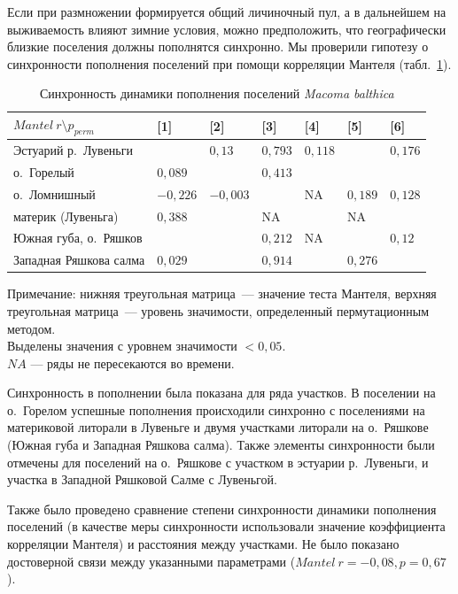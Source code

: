 Если при размножении формируется общий личиночный пул, а в дальнейшем на выживаемость влияют зимние условия, можно предположить, что географически близкие поселения должны пополнятся синхронно.
Мы проверили гипотезу о синхронности пополнения поселений при помощи корреляции Мантеля (табл.~\ref{tab:Mantel_dynamic_N1y}).
	\begin{table}[p]
	\caption{Синхронность динамики пополнения поселений {\it Macoma balthica}}
	\label{tab:Mantel_dynamic_N1y}
        \begin{tabularx}{\textwidth}{|p{}|*{6}{X|}} 
	\hline
	$Mantel \ r \setminus p_{perm}$ & [1] & [2] & [3] & [4] & [5] & [6] \\ \hline
	[1] Эстуарий р.~Лувеньги             &         & $0,13$    & $0,793$      & $0,118$   & \cellcolor{yellow}{$0,001$} & $0,176$ \\ \hline
	[2] о.~Горелый             & $0,089$   &         & $0,413$      & \cellcolor{yellow}{$0,009$}   & \cellcolor{yellow}{$0,004$} & \cellcolor{yellow}{$0,001$} \\ \hline
	[3] о.~Ломнишный          & $-0,226$  & $-0,003$  &            & NA      & $0,189$ & $0,128$ \\ \hline
	[4] материк (Лувеньга)             & $0,388$   & \cellcolor{yellow}{$0,955$}   & NA         &         & NA    & \cellcolor{yellow}{$0,02$}  \\ \hline
	[5] Южная губа, о.~Ряшков                 & \cellcolor{yellow}{$0,793$}   & \cellcolor{yellow}{$0,515$}   & $0,212$      & NA      &       & $0,12$  \\ \hline
	[6] Западная Ряшкова салма                 & $0,029$   & \cellcolor{yellow}{$0,986$}   & $0,914$      & \cellcolor{yellow}{$0,965$}   & $0,276$ &       \\ \hline 
	\end{tabularx}
	   {\footnotesize Примечание: нижняя треугольная матрица~--- значение теста Мантеля, верхняя треугольная матрица~--- уровень значимости, определенный пермутационным методом. \\
	Выделены значения с уровнем значимости $< 0,05$. \\
	$NA$ --- ряды не пересекаются во времени.}
	\end{table}
Синхронность в пополнении была показана для ряда участков.
В поселении на о.~Горелом успешные пополнения происходили синхронно с поселениями на материковой литорали в Лувеньге и двумя участками литорали на о.~Ряшкове (Южная губа и Западная Ряшкова салма).
Также элементы синхронности были отмечены для поселений на о.~Ряшкове с участком в эстуарии р.~Лувеньги, и участка в Западной Ряшковой Салме с Лувеньгой.

Также было проведено сравнение степени синхронности динамики пополнения поселений (в качестве меры синхронности использовали значение коэффициента корреляции Мантеля) и расстояния между участками.
Не было показано достоверной связи между указанными параметрами ($Mantel\ r = -0,08, p = 0,67$ ).

